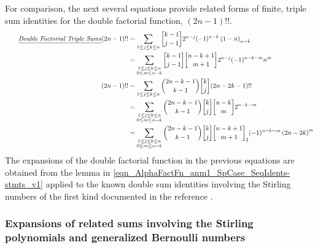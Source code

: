 \documentclass[12pt,reqno]{article}
\numberwithin{sfootnote}{section}
\numberwithin{equation}{section}
\newcommand{\tagtext}[1]{\tag*{\underline{\textit{#1}}}}
\theoremstyle{DefaultTheoremStyle}
\theoremstyle{definition}
\newcommand{\gkpSI}[2]{\ensuremath{\genfrac{\lbrack}{\rbrack}{0pt}{}{#1}{#2}}}
\newcommand{\FcfII}[3]{\ensuremath{\gkpSI{#2}{#3}_{#1}}}
\newcommand{\Pochhammer}[2]{\ensuremath{\left(#1\right)_{#2}}}
\begin{document}
For comparison, the next several equations provide 
related forms of finite, triple sum identities for the 
double factorial function, $(2n-1)!!$. 
\begin{align*} 
\notag 
\tagtext{Double Factorial Triple Sums} 
(2n-1)!! 
   & = 
     \sum\limits_{1 \leq j \leq k \leq n} 
     \gkpSI{k-1}{j-1} 2^{n-j} (-1)^{n-k} \Pochhammer{1-n}{n-k} \\ 
   & = 
     \sum\limits_{\substack{1 \leq j \leq k \leq n \\ 0 \leq m \leq n-k}} 
     \gkpSI{k-1}{j-1} \gkpSI{n-k+1}{m+1} 2^{n-j} (-1)^{n-k-m} n^{m} \\ 
(2n-1)!!   
   & = 
     \sum\limits_{1 \leq j \leq k \leq n} 
     \binom{2n-k-1}{k-1} \gkpSI{k}{j} 
     (2n-2k-1)!! \\ 
   & = 
     \sum\limits_{\substack{1 \leq j \leq k \leq n \\ 0 \leq m \leq n-k}} 
     \binom{2n-k-1}{k-1} \gkpSI{k}{j} \gkpSI{n-k}{m} 2^{n-k-m} \\ 
   & = 
     \sum\limits_{\substack{1 \leq j \leq k \leq n \\ 0 \leq m \leq n-k}} 
     \binom{2n-k-1}{k-1} \gkpSI{k}{j} \FcfII{2}{n-k+1}{m+1} 
     (-1)^{n-k-m} \left(2n - 2k\right)^{m} 
\end{align*} 
The expansions of the double factorial function in the previous 
equations are obtained from the lemma in 
\eqref{eqn_AlphaFactFn_anm1_SpCase_SeqIdents-stmts_v1} 
applied to the known double sum identities involving the 
Stirling numbers of the first kind 
documented in the reference 
\citep[\S 6]{DBLFACTFN-COMBIDENTS-SURVEY}. 

\subsubsection{Expansions of related sums involving the 
               Stirling polynomials and 
               generalized Bernoulli numbers} 
\label{subsubSection_S1TripleSums_GenSPolyExps} 
\end{document}
